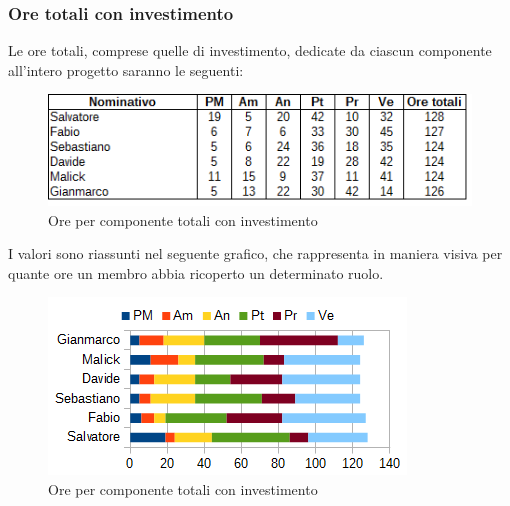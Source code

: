 		\subsubsection{Ore totali con investimento}
		Le ore totali, comprese quelle di investimento, dedicate da ciascun componente all'intero progetto saranno le seguenti: \\
		\begin{figure}[H]
			\centering
			\includegraphics[scale=0.75]{immagini/tabelle/riepilogo_conclusivo.png}
			\caption{Ore per componente totali con investimento}
		\end{figure}
		I valori sono riassunti nel seguente grafico, che rappresenta in maniera visiva per quante ore un membro abbia ricoperto un determinato ruolo. \\
		\begin{figure}[H]
			\centering
			\includegraphics[scale=1]{immagini/grafici/riepilogo_conclusivo-barra.png}
			\caption{Ore per componente totali con investimento}
		\end{figure}
